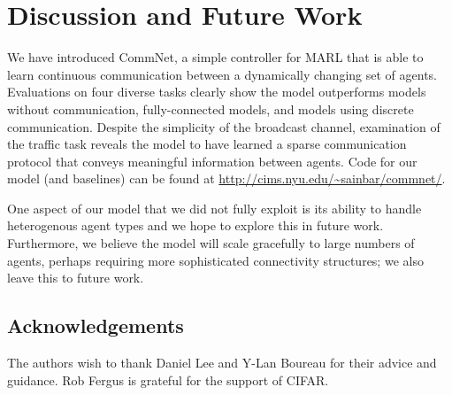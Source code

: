 \documentclass{article}
\begin{document}
\vspace{-4mm}
\section{Discussion and Future Work}
\vspace{-2mm} 
We have introduced CommNet, a simple controller for MARL that is able
to learn continuous communication between a dynamically changing set of agents. Evaluations on four
diverse tasks clearly show the model outperforms models without
communication, fully-connected models, and models using discrete communication.  Despite the simplicity of the
broadcast channel, examination of the traffic task reveals the model
to have learned a sparse communication protocol that conveys
meaningful information between agents. Code for our model (and baselines) can be found at \url{http://cims.nyu.edu/~sainbar/commnet/}.

 One aspect of our model that we did not fully
exploit is its ability to handle heterogenous agent types and we hope
to explore this in future work.  Furthermore, we believe the model will scale gracefully to large numbers of agents, perhaps requiring more sophisticated connectivity structures; we also leave this to future work.

\vspace{-2mm}
\subsection*{Acknowledgements}
\vspace{-2mm} 
The authors wish to thank Daniel Lee and Y-Lan Boureau for their
advice and guidance. Rob Fergus is grateful for the support of CIFAR.

\small
\vspace{-3mm}



\appendix
\end{document}
